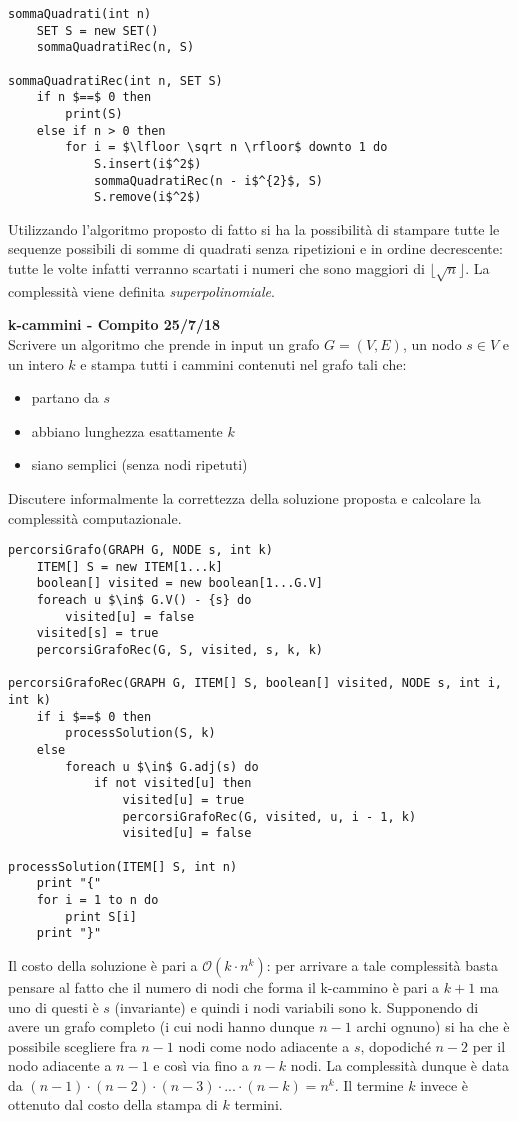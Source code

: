 \documentclass[../cheatSheetAlgoritmi.tex]{subfiles}
\begin{document}
\begin{lstlisting}[caption= Somma di Quadrati - Elenco Insiemi]
sommaQuadrati(int n)
	SET S = new SET()
	sommaQuadratiRec(n, S)
	
sommaQuadratiRec(int n, SET S)
	if n $==$ 0 then
		print(S)
	else if n > 0 then
		for i = $\lfloor \sqrt n \rfloor$ downto 1 do
			S.insert(i$^2$)
			sommaQuadratiRec(n - i$^{2}$, S)
			S.remove(i$^2$)	
\end{lstlisting}
Utilizzando l'algoritmo proposto di fatto si ha la possibilità di stampare tutte le sequenze possibili di somme di quadrati senza ripetizioni e in ordine decrescente: tutte le volte infatti verranno scartati i numeri che sono maggiori di $\lfloor \sqrt n \rfloor$. La complessità viene definita \emph{superpolinomiale}.

\bigskip
\textbf{k-cammini - Compito 25/7/18}\\
Scrivere un algoritmo che prende in input un grafo $G= (V, E)$, un nodo $s \in V$ e un intero $k$ e stampa tutti i cammini contenuti nel grafo tali che:
\begin{itemize}
	\item partano da $s$
	\item abbiano lunghezza esattamente $k$
	\item siano semplici (senza nodi ripetuti)
\end{itemize}
Discutere informalmente la correttezza della soluzione proposta e calcolare la complessità computazionale.
\begin{lstlisting}[caption=Percorsi grafo]
percorsiGrafo(GRAPH G, NODE s, int k)
    ITEM[] S = new ITEM[1...k]
    boolean[] visited = new boolean[1...G.V]
    foreach u $\in$ G.V() - {s} do
        visited[u] = false
    visited[s] = true
    percorsiGrafoRec(G, S, visited, s, k, k)

percorsiGrafoRec(GRAPH G, ITEM[] S, boolean[] visited, NODE s, int i, int k)
    if i $==$ 0 then
        processSolution(S, k)
    else
        foreach u $\in$ G.adj(s) do
            if not visited[u] then
	            visited[u] = true
	            percorsiGrafoRec(G, visited, u, i - 1, k)
	            visited[u] = false
            
processSolution(ITEM[] S, int n)
    print "{"
    for i = 1 to n do
        print S[i]
    print "}"
\end{lstlisting}
Il costo della soluzione è pari a $\mathcal{O}(k \cdot n^{k})$: per arrivare a tale complessità basta pensare al fatto che il numero di nodi che forma il k-cammino è pari a $k+1$ ma uno di questi è $s$ (invariante) e quindi i nodi variabili sono k. Supponendo di avere un grafo completo (i cui nodi hanno dunque $n-1$ archi ognuno) si ha che è possibile scegliere fra $n-1$ nodi come nodo adiacente a $s$, dopodiché $n-2$ per il nodo adiacente a $n-1$ e così via fino a $n-k$ nodi. La complessità dunque è data da $(n-1) \cdot (n-2) \cdot (n-3) \cdot ... \cdot (n-k) = n^{k}$. Il termine $k$ invece è ottenuto dal costo della stampa di $k$ termini.
\newpage
\end{document}
